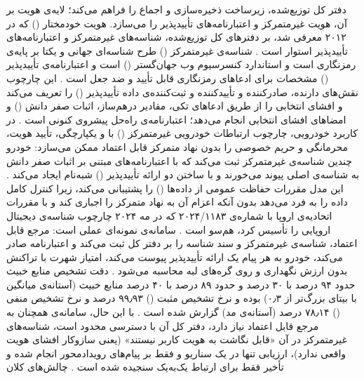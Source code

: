 \documentclass[12pt,a4paper]{article}
\begin{document}
دفتر کل توزیع‌شده، زیرساخت ذخیره‌سازی و اجماع را فراهم می‌کند؛ لایه‌ی هویت بر آن، هویت غیرمتمرکز و اعتبارنامه‌های تأییدپذیر را می‌سازد. هویت خودمختار () که در ۲۰۱۲ معرفی شد، بر دفتر‌های کل توزیع‌شده، شناسه‌های غیرمتمرکز و اعتبارنامه‌های تأییدپذیر استوار است \cite{mazzocca2025survey}. شناسه‌ی غیرمتمرکز () طرح شناسه‌ای جهانی و یکتا بر پایه‌ی رمزنگاری است و استاندارد کنسرسیوم وب جهان‌گستر () است \cite{mazzocca2025survey} و اعتبارنامه‌ی تأییدپذیر () مشخصات  برای ادعا‌های رمزنگاری قابل تأیید و ضد جعل است \cite{mazzocca2025survey}. این چارچوب نقش‌های دارنده، صادرکننده و تأییدکننده و ثبت‌کننده‌ی داده تأییدپذیر () را تعریف می‌کند \cite{mazzocca2025survey} و افشای انتخابی را از طریق ادعا‌های تکی، مقادیر درهم‌ساز، اثبات صفر دانش () و امضا‌های افشای انتخابی انجام می‌دهد؛ اعتبارنامه‌ی  راه‌حل پیشروی کنونی است \cite{mazzocca2025survey}. در کاربرد خودرویی، چارچوب ارتباطات خودرویی غیرمتمرکز () با  و  یکپارچگی، تأیید هویت، محرمانگی و حریم خصوصی را بدون نهاد متمرکز قابل اعتماد ممکن می‌سازد: خودرو چندین شناسه‌ی غیرمتمرکز ثبت می‌کند که با اعتبارنامه‌های مبتنی بر اثبات صفر دانش به شناسه‌ی اصلی پیوند می‌خورند و با ساختن دو ارائه تأییدپذیر () شبه‌نام ایجاد می‌کند \cite{mazzocca2025survey}. این مدل مقررات حفاظت عمومی از داده‌ها () را پشتیبانی می‌کند، زیرا کنترل کامل داده را به فرد می‌دهد بدون آنکه اعزام آن به نهاد متمرکز را اجباری کند \cite{mazzocca2025survey} و با مقررات اتحادیه‌ی اروپا با شماره‌ی ۲۰۲۴/۱۱۸۳ که در مه ۲۰۲۴ چارچوب شناسه‌ی دیجیتال اروپایی را تأسیس کرد، هم‌سو است \cite{mazzocca2025survey}. سامانه‌ی  نمونه‌ای عملی است: مرجع قابل اعتماد، شناسه‌ی غیرمتمرکز و سند شناسه را بر دفتر کل ثبت می‌کند و اعتبارنامه صادر می‌کند، خودرو به هر پیام یک ارائه تأییدپذیر پیوست می‌کند، امتیاز شهرت با تراکنش بدون ارزش نگهداری و روی گره‌های لبه محاسبه می‌شود \cite{feraudoDIVADIDbasedReputation2024}. دقت تشخیص منابع خبیث حدود ۹۴ درصد با ۳۰ درصد و حدود ۸۹ درصد با ۴۰ درصد منابع خبیث (آستانه‌ی میانگین با بیتای بزرگ‌تر از ۰٫۳) بوده و نرخ تشخیص مثبت () ۹۹٫۹۳ درصد و نرخ تشخیص منفی () ۷۸٫۱۴ درصد (آستانه‌ی مد) گزارش شده است \cite{feraudoDIVADIDbasedReputation2024}. با این حال، سامانه‌ی  همچنان به مرجع قابل اعتماد نیاز دارد، دفتر کل آن با دسترسی محدود است، شناسه‌های غیرمتمرکز در آن «قابل نگاشت به هویت کاربر نیستند» (یعنی سازوکار افشای هویت واقعی ندارد)، ارزیابی تنها در یک سناریو و فقط بر پیام‌های رویدادمحور انجام شده و تأخیر فقط برای ارتباط یک‌به‌یک سنجیده شده است \cite{feraudoDIVADIDbasedReputation2024}. چالش‌های کلان 
\end{document}
